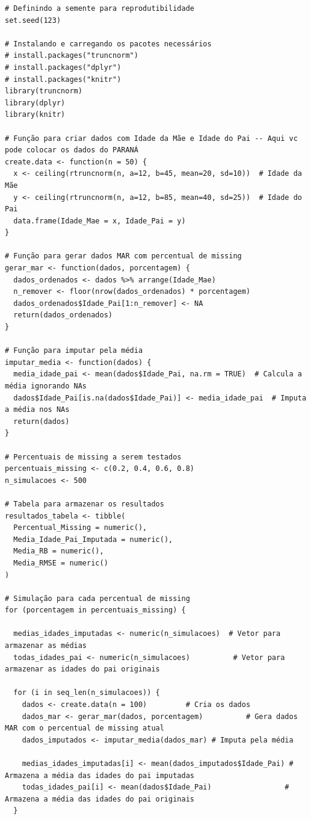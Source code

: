 \documentclass[11pt]{article}
\begin{document}
\begin{verbatim}
# Definindo a semente para reprodutibilidade
set.seed(123)

# Instalando e carregando os pacotes necessários
# install.packages("truncnorm")
# install.packages("dplyr")
# install.packages("knitr")
library(truncnorm)
library(dplyr)
library(knitr)

# Função para criar dados com Idade da Mãe e Idade do Pai -- Aqui vc pode colocar os dados do PARANÁ
create.data <- function(n = 50) {
  x <- ceiling(rtruncnorm(n, a=12, b=45, mean=20, sd=10))  # Idade da Mãe
  y <- ceiling(rtruncnorm(n, a=12, b=85, mean=40, sd=25))  # Idade do Pai
  data.frame(Idade_Mae = x, Idade_Pai = y)
}

# Função para gerar dados MAR com percentual de missing
gerar_mar <- function(dados, porcentagem) {
  dados_ordenados <- dados %>% arrange(Idade_Mae)
  n_remover <- floor(nrow(dados_ordenados) * porcentagem)
  dados_ordenados$Idade_Pai[1:n_remover] <- NA
  return(dados_ordenados)
}

# Função para imputar pela média
imputar_media <- function(dados) {
  media_idade_pai <- mean(dados$Idade_Pai, na.rm = TRUE)  # Calcula a média ignorando NAs
  dados$Idade_Pai[is.na(dados$Idade_Pai)] <- media_idade_pai  # Imputa a média nos NAs
  return(dados)
}

# Percentuais de missing a serem testados
percentuais_missing <- c(0.2, 0.4, 0.6, 0.8)
n_simulacoes <- 500

# Tabela para armazenar os resultados
resultados_tabela <- tibble(
  Percentual_Missing = numeric(),
  Media_Idade_Pai_Imputada = numeric(),
  Media_RB = numeric(),
  Media_RMSE = numeric()
)

# Simulação para cada percentual de missing
for (porcentagem in percentuais_missing) {
  
  medias_idades_imputadas <- numeric(n_simulacoes)  # Vetor para armazenar as médias
  todas_idades_pai <- numeric(n_simulacoes)          # Vetor para armazenar as idades do pai originais
  
  for (i in seq_len(n_simulacoes)) {
    dados <- create.data(n = 100)         # Cria os dados
    dados_mar <- gerar_mar(dados, porcentagem)          # Gera dados MAR com o percentual de missing atual
    dados_imputados <- imputar_media(dados_mar) # Imputa pela média
    
    medias_idades_imputadas[i] <- mean(dados_imputados$Idade_Pai) # Armazena a média das idades do pai imputadas
    todas_idades_pai[i] <- mean(dados$Idade_Pai)                 # Armazena a média das idades do pai originais
  }
  

\end{verbatim}
\end{document}
